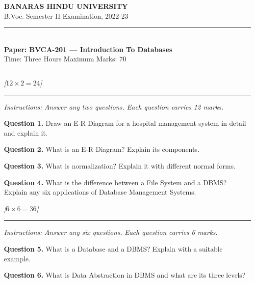 \documentclass[11pt,a4paper]{article}
\newcommand{\pts}[1]{\hfill   \textit{[#1]}}
\begin{document}
\begin{center}
  {\large\bfseries BANARAS HINDU UNIVERSITY}\\[2pt]
  {\normalsize B.Voc. Semester II Examination, 2022-23}\\[6pt]
  \rule{0.8\linewidth}{0.5pt}\\[6pt]
  {\large\bfseries Paper: BVCA-201 --- Introduction To Databases}\\[4pt]
  {\normalsize Time: Three Hours \hfill Maximum Marks: 70}
\end{center}

\rule{\linewidth}{0.4pt}

\smallskip
\bigskip


\pts{$12  \times 2 = 24$}
\rule{\linewidth}{0.4pt}\smallskip




\noindent   \textit{Instructions: Answer any two questions. Each question carries 12 marks.}

\medskip


\noindent   \textbf{Question 1.} Draw an E-R Diagram for a hospital management system in detail and explain it.

\medskip


\noindent   \textbf{Question 2.} What is an E-R Diagram? Explain its components.

\medskip


\noindent   \textbf{Question 3.} What is normalization? Explain it with different normal forms.

\medskip


\noindent   \textbf{Question 4.} What is the difference between a File System and a DBMS? Explain any six applications of Database Management Systems.

\bigskip


\pts{$6  \times 6 = 36$}
\rule{\linewidth}{0.4pt}\smallskip




\noindent   \textit{Instructions: Answer any six questions. Each question carries 6 marks.}

\medskip


\noindent   \textbf{Question 5.} What is a Database and a DBMS? Explain with a suitable example.

\medskip


\noindent   \textbf{Question 6.} What is Data Abstraction in DBMS and what are its three levels?
\end{document}
